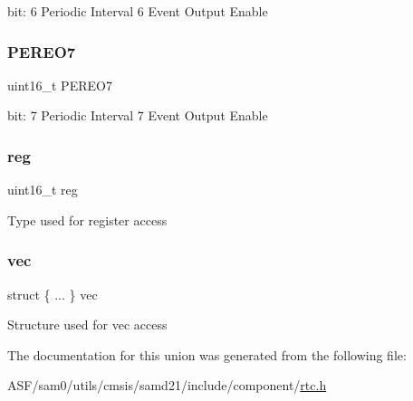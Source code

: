 bit\+: 6 Periodic Interval 6 Event Output Enable \mbox{\label{union_r_t_c___m_o_d_e1___e_v_c_t_r_l___type_a0118b512cae84cadf15a886f3e7a39b6}} 
\subsubsection{\texorpdfstring{PEREO7}{PEREO7}}
{\footnotesize\ttfamily uint16\+\_\+t P\+E\+R\+E\+O7}

bit\+: 7 Periodic Interval 7 Event Output Enable \mbox{\label{union_r_t_c___m_o_d_e1___e_v_c_t_r_l___type_a11760f5020019f4aa8cb02e694f7cc44}} 
\subsubsection{\texorpdfstring{reg}{reg}}
{\footnotesize\ttfamily uint16\+\_\+t reg}

Type used for register access \mbox{\label{union_r_t_c___m_o_d_e1___e_v_c_t_r_l___type_a729de4c0825d657c8c2c038725bfa3be}} 
\subsubsection{\texorpdfstring{vec}{vec}}
{\footnotesize\ttfamily struct \{ ... \}   vec}

Structure used for vec access 

The documentation for this union was generated from the following file\+:\begin{DoxyCompactItemize}
\item 
A\+S\+F/sam0/utils/cmsis/samd21/include/component/\mbox{\hyperlink{component_2rtc_8h}{rtc.\+h}}\end{DoxyCompactItemize}
